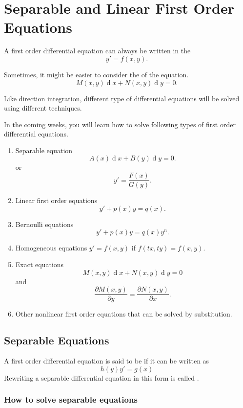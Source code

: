\chapter{Separable and Linear First Order Equations}

A first order differential equation can always be written in the 
\[y'=f(x, y).\]

Sometimes, it might be easier to consider the  of the equation.
\[M(x, y)\operatorname{d} x + N(x, y)\operatorname{d} y=0.\]

Like direction integration, different type of differential equations will be solved using different techniques. 

In the coming weeks, you will learn how to solve following types of first order differential equations.

\begin{enumerate}
  \item Separable equation
\[A(x)\operatorname{d} x+B(y)\operatorname{d} y=0.\]
  or \[y'=\frac{F(x)}{G(y)}.\]
  \item Linear first order equations
\[y' + p(x) y = q(x).\]
  \item Bernoulli equations
\[y' + p(x) y = q(x)y^n.\]
  \item Homogeneous equations
  $y'=f(x,y)$ if $f(tx,ty)=f(x,y)$. 
  \item Exact equations 
\[M(x,y)\operatorname{d} x+N(x,y)\operatorname{d} y=0\] and 
\[\frac{\partial{M(x,y)}}{\partial y}=\frac{\partial{N(x,y)}}{\partial x}.\]
\item Other nonlinear first order equations that can be solved by substitution.
\end{enumerate}

\section{Separable Equations}
\begin{definition}
  A first order differential equation is said to be  if it can be written as
  \begin{equation}
    h(y)y'=g(x)\label{eq:2.1.1}
  \end{equation}
  Rewriting a separable differential equation in this form is called .
\end{definition}


\subsection{How to solve separable equations}

